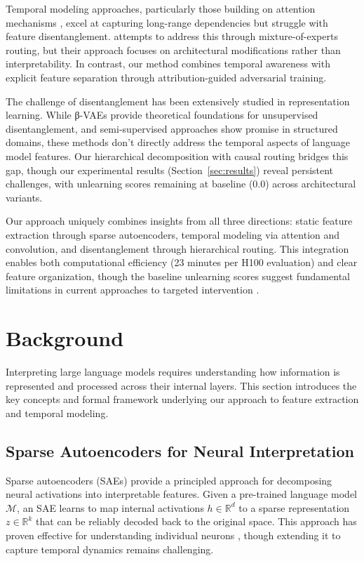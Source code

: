 \documentclass{article} %
\begin{document}
Temporal modeling approaches, particularly those building on attention mechanisms \cite{vaswani2017attention}, excel at capturing long-range dependencies but struggle with feature disentanglement. \cite{Park2024MonetMO} attempts to address this through mixture-of-experts routing, but their approach focuses on architectural modifications rather than interpretability. In contrast, our method combines temporal awareness with explicit feature separation through attribution-guided adversarial training.

The challenge of disentanglement has been extensively studied in representation learning. While β-VAEs \cite{Burgess2018UnderstandingDI} provide theoretical foundations for unsupervised disentanglement, and semi-supervised approaches \cite{Narayanaswamy2017LearningDR} show promise in structured domains, these methods don't directly address the temporal aspects of language model features. Our hierarchical decomposition with causal routing bridges this gap, though our experimental results (Section~\ref{sec:results}) reveal persistent challenges, with unlearning scores remaining at baseline (0.0) across architectural variants.

Our approach uniquely combines insights from all three directions: static feature extraction through sparse autoencoders, temporal modeling via attention and convolution, and disentanglement through hierarchical routing. This integration enables both computational efficiency (23 minutes per H100 evaluation) and clear feature organization, though the baseline unlearning scores suggest fundamental limitations in current approaches to targeted intervention \cite{radford2019language}.

\section{Background}
\label{sec:background}

Interpreting large language models requires understanding how information is represented and processed across their internal layers. This section introduces the key concepts and formal framework underlying our approach to feature extraction and temporal modeling.

\subsection{Sparse Autoencoders for Neural Interpretation}
Sparse autoencoders (SAEs) \cite{Bengio2007LearningDA} provide a principled approach for decomposing neural activations into interpretable features. Given a pre-trained language model $\mathcal{M}$, an SAE learns to map internal activations $h \in \mathbb{R}^d$ to a sparse representation $z \in \mathbb{R}^k$ that can be reliably decoded back to the original space. This approach has proven effective for understanding individual neurons \cite{Mu2020CompositionalEO}, though extending it to capture temporal dynamics remains challenging.
\end{document}
